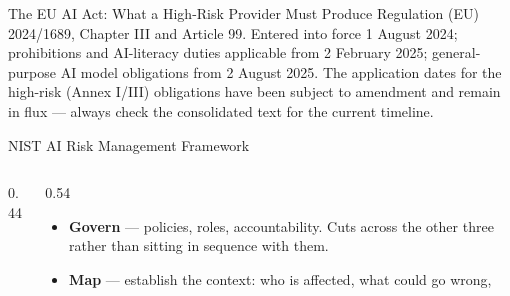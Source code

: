 \begin{frame}[allowframebreaks]{The EU AI Act: What a High-Risk Provider Must Produce}
    \vspace{0.15em}
    {\scriptsize Regulation (EU) 2024/1689, Chapter III and Article 99. Entered into force 1 August
    2024; prohibitions and AI-literacy duties applicable from 2 February 2025; general-purpose AI
    model obligations from 2 August 2025. The application dates for the high-risk (Annex I/III)
    obligations have been subject to amendment and remain in flux --- always check the consolidated
    text for the current timeline.}
\end{frame}

\begin{frame}{NIST AI Risk Management Framework}

    \begin{columns}[c]
        \begin{column}{0.44\textwidth}
            \centering
        \end{column}
        \begin{column}{0.54\textwidth}
            \begin{itemize}\scriptsize
                \setlength\itemsep{0.4em}
                \item \textbf{Govern} --- policies, roles, accountability. Cuts across the other
                      three rather than sitting in sequence with them.
                \item \textbf{Map} --- establish the context: who is affected, what could go wrong,

\end{itemize}
\end{column}
\end{columns}
\end{frame}
